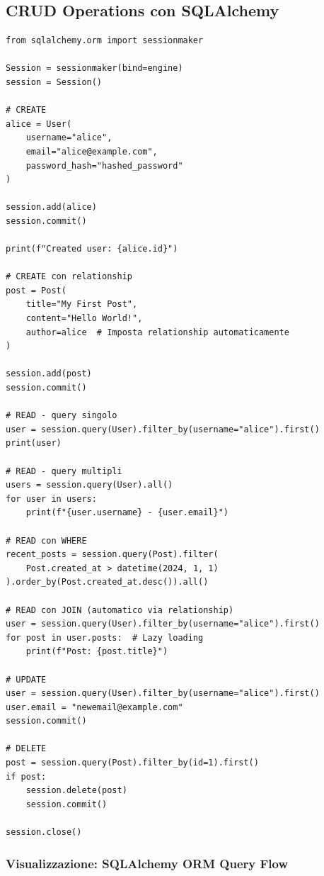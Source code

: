 \subsection{CRUD Operations con SQLAlchemy}

\begin{lstlisting}
from sqlalchemy.orm import sessionmaker

Session = sessionmaker(bind=engine)
session = Session()

# CREATE
alice = User(
    username="alice",
    email="alice@example.com",
    password_hash="hashed_password"
)

session.add(alice)
session.commit()

print(f"Created user: {alice.id}")

# CREATE con relationship
post = Post(
    title="My First Post",
    content="Hello World!",
    author=alice  # Imposta relationship automaticamente
)

session.add(post)
session.commit()

# READ - query singolo
user = session.query(User).filter_by(username="alice").first()
print(user)

# READ - query multipli
users = session.query(User).all()
for user in users:
    print(f"{user.username} - {user.email}")

# READ con WHERE
recent_posts = session.query(Post).filter(
    Post.created_at > datetime(2024, 1, 1)
).order_by(Post.created_at.desc()).all()

# READ con JOIN (automatico via relationship)
user = session.query(User).filter_by(username="alice").first()
for post in user.posts:  # Lazy loading
    print(f"Post: {post.title}")

# UPDATE
user = session.query(User).filter_by(username="alice").first()
user.email = "newemail@example.com"
session.commit()

# DELETE
post = session.query(Post).filter_by(id=1).first()
if post:
    session.delete(post)
    session.commit()

session.close()
\end{lstlisting}

\subsubsection{Visualizzazione: SQLAlchemy ORM Query Flow}

